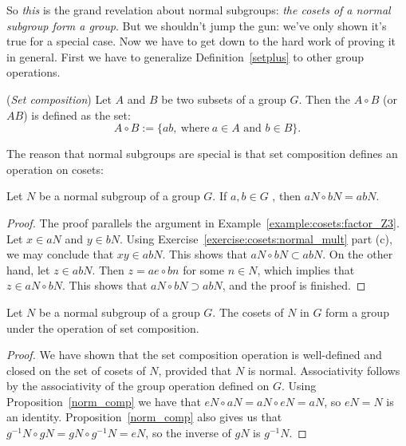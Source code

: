 { So \emph{this} is the grand revelation about normal subgroups: \emph{the cosets of a normal subgroup form a group}. But we shouldn't jump the gun: we've only shown it's true for a special case. Now we have to get down to the hard work of proving it in general. First we have to generalize Definition~\ref{setplus} to other group operations.

\begin{defn}\label{setcomp}(\emph{Set composition})  Let $A$ and $B$ be two subsets of a group $G$.  Then the  $A \circ B$ (or $AB$)  is defined as the set:
\[ A \circ B := \{a b, \mathrm{~where~} a \in A \text{ and } b \in B\} .\]
\end{defn}

The reason that normal subgroups are special is that set composition defines an operation on cosets:

\begin{thm}\label{norm_comp}
Let $N$ be a normal subgroup of a group $G$. If $a,b \in G$ , then $aN \circ bN = abN$.
\end{thm}
\begin{proof}
The proof parallels the argument in Example~\ref{example:cosets:factor_Z3}. Let $x \in aN$ and $y \in bN$. 
Using Exercise~\ref{exercise:cosets:normal_mult} part (c), we may conclude that $xy \in abN$.  This shows that $aN \circ bN \subset abN$.  On the other hand,
let $z \in abN$.  Then $z = ae \circ b  n$ for some $n\in N$, which implies that $z \in aN \circ bN$.  This shows that $aN \circ bN \supset abN$, and the proof is finished.
\end{proof}

\begin{thm}
Let $N$ be a normal subgroup of a group $G$. The cosets of $N$ in $G$
form a group under the operation of set composition. 
\end{thm}
  
\begin{proof}
We have shown that the set composition operation is well-defined and closed on the set of cosets of $N$, provided that $N$ is normal. 
Associativity follows by the associativity of the group operation defined on $G$.
Using Proposition~\ref{norm_comp} we have that $eN \circ aN = aN \circ eN = aN$, so $eN = N$ is an identity.  
Proposition~\ref{norm_comp} also gives us that $g^{-1}N \circ gN = gN \circ g^{-1}N = eN$, so the inverse of $gN$ is $g^{-1} N$. 
\end{proof}

}
